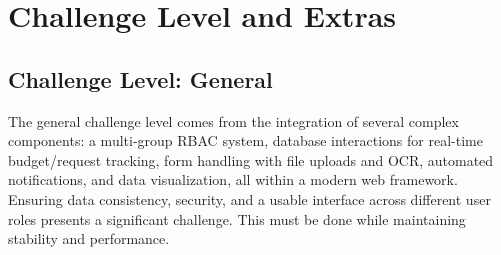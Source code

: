 \documentclass{article}
\begin{document}
\section{Challenge Level and Extras}

\subsection{Challenge Level: General}
The general challenge level comes from the integration of several complex components: a multi-group RBAC system, database interactions for real-time budget/request tracking, form handling with file uploads and OCR, automated notifications, and data visualization, all within a modern web framework. Ensuring data consistency, security, and a usable interface across different user roles presents a significant challenge. This must be done while maintaining stability and performance.
\end{document}
